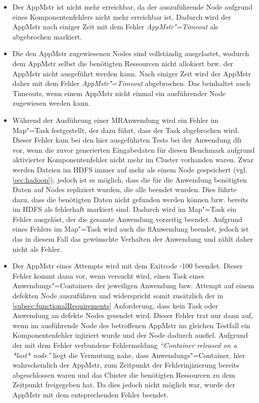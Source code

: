 \begin{itemize}
    \item
        Der \gls{AppMstr} ist nicht mehr erreichbar, da der auszuführende Node aufgrund eines Komponentenfehlers nicht mehr erreichbar ist.
        Dadurch wird der \gls{AppMstr} nach einiger Zeit mit dem Fehler \emph{\gls{AppMstr}"=Timeout} als abgebrochen markiert.
    \item
        Die den \gls{AppMstr} zugewiesenen Nodes sind vollständig ausgelastet, wodurch dem \gls{AppMstr} selbst die benötigten Ressourcen nicht allokiert bzw. der \gls{AppMstr} nicht ausgeführt werden kann.
        Nach einiger Zeit wird der \gls{AppMstr} daher mit dem Fehler \emph{\gls{AppMstr}"=Timeout} abgebrochen.
        Das beinhaltet auch Timeouts, wenn einem \gls{AppMstr} nicht einmal ein ausführender Node zugewiesen werden kann.
    \item
        Während der Ausführung einer \gls{MR}\gls{Anwendung} wird ein Fehler im Map"=Task festgestellt, der dazu führt, dass der Task abgebrochen wird.
        Dieser Fehler kam bei den hier ausgeführten \glspl{Test} bei der \gls{Anwendung} \acrlong{dfr} vor, wenn die zuvor generierten Eingabedaten für diesen Benchmark aufgrund aktivierter Komponentenfehler nicht mehr im Cluster vorhanden waren.
        Zwar werden Dateien im \gls{HDFS} immer auf mehr als einem Node gespeichert (vgl. \cref{sec:hadoop}), jedoch ist es möglich, dass die für die \gls{Anwendung} benötigten Daten auf Nodes repliziert wurden, die alle beendet wurden.
        Dies führte dazu, dass die benötigten Daten nicht gefunden werden können bzw. bereits im \gls{HDFS} als fehlerhaft markiert sind.
        Dadurch wird im Map"=Task ein Fehler ausgelöst, der die gesamte \gls{Anwendung} vorzeitig beendet.
        Aufgrund eines Fehlers im Map"=Task wird auch die \acrlong{fl}\gls{Anwendung} beendet, jedoch ist das in diesem Fall das gewünschte Verhalten der \gls{Anwendung} und zählt daher nicht als Fehler.
    \item
        Der \gls{AppMstr} eines \glspl{Attempt} wird mit dem Exitcode -100 beendet.
        Dieser Fehler kommt dann vor, wenn versucht wird, einen Task eines Anwendungs"=Containers der jeweiligen \gls{Anwendung} bzw. \gls{Attempt} auf einem defekten Node auszuführen und widerspricht somit zusätzlich der in \cref{subsec:functionalRequirements} Anforderung, dass kein Task oder \gls{Anwendung} an defekte Nodes gesendet wird.
        Dieser Fehler trat nur dann auf, wenn im ausführende Node des betroffenen \gls{AppMstr} im gleichen \gls{Testfall} ein Komponentenfehler injiziert wurde und der Node dadurch ausfiel.
        Aufgrund der mit dem Fehler verbundene Fehlermeldung \textit{\enquote{Container released on a *lost* node}} liegt die Vermutung nahe, dass Anwendungs"=Container, hier wahrscheinlich der \gls{AppMstr}, zum Zeitpunkt der Fehlerinjizierung bereits abgeschlossen waren und das Cluster die benötigten Ressourcen zu dem Zeitpunkt freigegeben hat.
        Da dies jedoch nicht möglich war, wurde der \gls{AppMstr} mit dem entsprechenden Fehler beendet.
\end{itemize}

